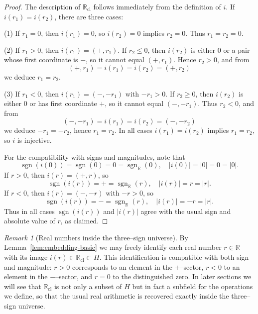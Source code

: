 \documentclass[11pt]{amsart}
\numberwithin{equation}{section}
\theoremstyle{definition}
\theoremstyle{remark}
\newtheorem{remark}[theorem]{Remark}
\newcommand{\R}{\mathbb{R}}
\newcommand{\Rc}{\mathbb{R}_{\mathrm{cl}}} %
\newcommand{\Hnum}{H}                      %
\newcommand{\sgn}{\operatorname{sgn}}
\newcommand{\iemb}{i}                      %
\begin{document}
\begin{proof}
The description of $\Rc$ follows immediately from the definition of
$\iemb$.  If $\iemb(r_1)=\iemb(r_2)$, there are three cases:

\smallskip
\noindent
(1) If $r_1=0$, then $\iemb(r_1)=0$, so $\iemb(r_2)=0$ implies
$r_2=0$.  Thus $r_1=r_2=0$.

\smallskip
\noindent
(2) If $r_1>0$, then $\iemb(r_1)=(+,r_1)$.  If $r_2\le0$, then
$\iemb(r_2)$ is either $0$ or a pair whose first coordinate is $-$,
so it cannot equal $(+,r_1)$.  Hence $r_2>0$, and from
\[
  ( +, r_1 ) = \iemb(r_1) = \iemb(r_2) = ( +, r_2 )
\]
we deduce $r_1=r_2$.

\smallskip
\noindent
(3) If $r_1<0$, then $\iemb(r_1)=(-,-r_1)$ with $-r_1>0$.  If $r_2\ge0$,
then $\iemb(r_2)$ is either $0$ or has first coordinate $+$, so it
cannot equal $(-,-r_1)$.  Thus $r_2<0$, and from
\[
  ( -, -r_1 ) = \iemb(r_1) = \iemb(r_2) = ( -, -r_2 )
\]
we deduce $-r_1=-r_2$, hence $r_1=r_2$.  In all cases
$\iemb(r_1)=\iemb(r_2)$ implies $r_1=r_2$, so $\iemb$ is injective.

For the compatibility with signs and magnitudes, note that
\[
  \sgn(\iemb(0))=\sgn(0)=0=\operatorname{sgn}_\R(0),
  \quad
  |\iemb(0)|=|0|=0=|0|.
\]
If $r>0$, then $\iemb(r)=(+,r)$, so
\[
  \sgn(\iemb(r)) = + = \operatorname{sgn}_\R(r),
  \quad
  |\iemb(r)| = r = |r|.
\]
If $r<0$, then $\iemb(r)=(-,-r)$ with $-r>0$, so
\[
  \sgn(\iemb(r)) = - = \operatorname{sgn}_\R(r),
  \quad
  |\iemb(r)| = -r = |r|.
\]
Thus in all cases $\sgn(\iemb(r))$ and $|\iemb(r)|$ agree with the
usual sign and absolute value of $r$, as claimed.
\end{proof}

\begin{remark}[Real numbers inside the three--sign universe]\label{rem:Rc-inline}
By Lemma~\ref{lem:embedding-basic} we may freely identify each real
number $r\in\R$ with its image $\iemb(r)\in\Rc\subset\Hnum$.  This
identification is compatible with both sign and magnitude:
$r>0$ corresponds to an element in the $+$--sector, $r<0$ to an
element in the $-$--sector, and $r=0$ to the distinguished zero.  In
later sections we will see that $\Rc$ is not only a subset of $\Hnum$
but in fact a subfield for the operations we define, so that the usual
real arithmetic is recovered exactly inside the three--sign universe.
\end{remark}

\end{document}
